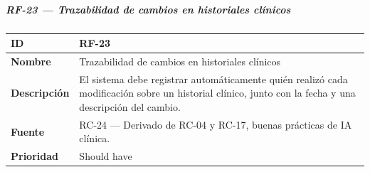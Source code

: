 \subparagraph{RF-23 --- Trazabilidad de cambios en historiales
clínicos}\label{rf-23-trazabilidad-de-cambios-en-historiales-cluxednicos}

{\def\LTcaptype{none} %
\begin{longtable}[]{@{}
  >{\raggedright\arraybackslash}p{}
  >{\raggedright\arraybackslash}p{}@{}}
\toprule\noalign{}
\begin{minipage}[b]{\linewidth}\raggedright
\textbf{ID}
\end{minipage} & \begin{minipage}[b]{\linewidth}\raggedright
RF-23
\end{minipage} \\
\midrule\noalign{}
\endhead
\bottomrule\noalign{}
\endlastfoot
\textbf{Nombre} & \begin{minipage}[t]{\linewidth}\raggedright
Trazabilidad de cambios en historiales clínicos
\end{minipage} \\
\textbf{Descripción} & \begin{minipage}[t]{\linewidth}\raggedright
El sistema debe registrar automáticamente quién realizó cada
modificación sobre un historial clínico, junto con la fecha y una
descripción del cambio.
\end{minipage} \\
\textbf{Fuente} & \begin{minipage}[t]{\linewidth}\raggedright
RC-24 --- Derivado de RC-04 y RC-17, buenas prácticas de IA clínica.
\end{minipage} \\
\textbf{Prioridad} & \begin{minipage}[t]{\linewidth}\raggedright
Should have
\end{minipage} \\
\end{longtable}
}

